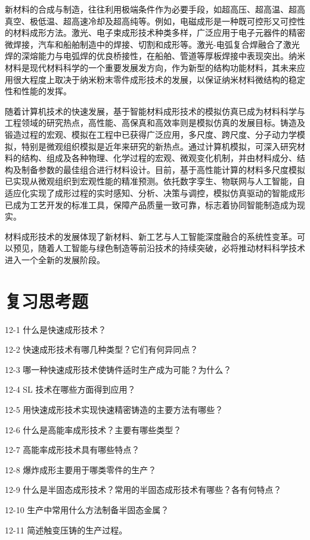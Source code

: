 \documentclass[UTF8]{ctexbook}
\newcommand{\◎}{\ensuremath{\bigcirc}}
\begin{document}
新材料的合成与制造，往往利用极端条件作为必要手段，如超高压、超高温、超高真空、极低温、超高速冷却及超高纯等。例如，电磁成形是一种既可控形又可控性的材料成形方法。激光、电子束成形技术种类多样，广泛应用于电子元器件的精密微焊接，汽车和船舶制造中的焊接、切割和成形等。激光-电弧复合焊融合了激光焊的深熔能力与电弧焊的优良桥接性，在船舶、管道等厚板焊接中表现突出。纳米材料是现代材料科学的一个重要发展发方向，作为新型的结构功能材料，其未来应用很大程度上取决于纳米粉末零件成形技术的发展，以保证纳米材料微结构的稳定性和性能的发挥。

随着计算机技术的快速发展，基于智能材料成形技术的模拟仿真已成为材料科学与工程领域的研究热点，高性能、高保真和高效率则是模拟仿真的发展目标。铸造及锻造过程的宏观、模拟在工程中已获得广泛应用，多尺度、跨尺度、分子动力学模拟，特别是微观组织模拟是近年来研究的新热点。通过计算机模拟，可深入研究材料的结构、组成及各种物理、化学过程的宏观、微观变化机制，并由材料成分、结构及制备参数的最佳组合进行材料设计。目前，基于高性能计算的材料多尺度模拟已实现从微观组织到宏观性能的精准预测。依托数字孪生、物联网与人工智能，自适应化实现了成形过程的实时感知、分析、决策与调控，模拟仿真驱动的智能成形已成为工艺开发的标准工具，保障产品质量一致可靠，标志着协同智能制造成为现实。

材料成形技术的发展体现了新材料、新工艺与人工智能深度融合的系统性变革。可以预见，随着人工智能与绿色制造等前沿技术的持续突破，必将推动材料科学技术进入一个全新的发展阶段。

\section*{复习思考题}

 
12-1 什么是快速成形技术？

12-2 快速成形技术有哪几种类型？它们有何异同点？

12-3 哪一种快速成形技术使铸件适时生产成为可能？为什么？

12-4 SL 技术在哪些方面得到应用？

12-5 用快速成形技术实现快速精密铸造的主要方法有哪些？

12-6 什么是高能率成形技术？主要有哪些类型？

12-7 高能率成形技术具有哪些特点？

12-8 爆炸成形主要用于哪类零件的生产？

12-9 什么是半固态成形技术？常用的半固态成形技术有哪些？各有何特点？

12-10 生产中常用什么方法制备半固态金属？

12-11 简述触变压铸的生产过程。
\end{document}
